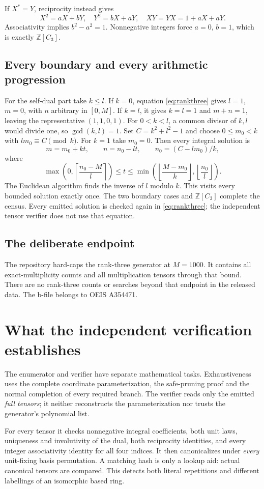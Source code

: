 \documentclass[11pt,a4paper]{article}
\theoremstyle{definition}\newtheorem{definition}[theorem]{Definition}\newtheorem{remark}[theorem]{Remark}
\newcommand{\ZZ}{\mathbb Z}\newcommand{\CC}{\mathbb C}\newcommand{\Q}{\mathbb Q}
\begin{document}
If $X^*=Y$, reciprocity instead gives
\[
X^2=aX+bY,\quad Y^2=bX+aY,\quad XY=YX=1+aX+aY.
\]
Associativity implies $b^2-a^2=1$. Nonnegative integers force $a=0$, $b=1$,
which is exactly $\ZZ[C_3]$.

\subsection{Every boundary and every arithmetic progression}
For the self-dual part take $k\leq l$. If $k=0$, equation
\eqref{eq:rankthree} gives $l=1$, $m=0$, with $n$ arbitrary in $[0,M]$.
If $k=l$, it gives $k=l=1$ and $m+n=1$, leaving the representative $(1,1,0,1)$.
For $0<k<l$, a common divisor of $k,l$ would divide one, so $\gcd(k,l)=1$.
Set $C=k^2+l^2-1$ and choose $0\leq m_0<k$ with $lm_0\equiv C\pmod k$.
For $k=1$ take $m_0=0$. Then every integral solution is
\[
m=m_0+kt,\qquad n=n_0-lt,\qquad n_0=(C-lm_0)/k,
\]
where
\[
\max\left(0,\left\lceil\frac{n_0-M}{l}\right\rceil\right)
\leq t\leq
\min\left(\left\lfloor\frac{M-m_0}{k}\right\rfloor,
          \left\lfloor\frac{n_0}{l}\right\rfloor\right).
\]
The Euclidean algorithm finds the inverse of $l$ modulo $k$. This visits
every bounded solution exactly once. The two boundary cases and $\ZZ[C_3]$
complete the census. Every emitted solution is checked again in
\eqref{eq:rankthree}; the independent tensor verifier does not use that equation.

\subsection{The deliberate endpoint}
The repository hard-caps the rank-three generator at $M=1000$. It contains
all exact-multiplicity counts and all multiplication tensors through that
bound. There are no rank-three counts or searches beyond that endpoint in
the released data. The b-file belongs to OEIS A354471.

\section{What the independent verification establishes}
The enumerator and verifier have separate mathematical tasks. Exhaustiveness
uses the complete coordinate parameterization, the safe-pruning proof and the
normal completion of every required branch. The verifier reads only the emitted
\emph{full tensors}; it neither reconstructs the parameterization nor trusts the
generator's polynomial list.

For every tensor it checks nonnegative integral coefficients, both unit laws,
uniqueness and involutivity of the dual, both reciprocity identities, and every
integer associativity identity for all four indices. It then canonicalizes
under \emph{every} unit-fixing basis permutation. A matching hash is only a
lookup aid: actual canonical tensors are compared. This detects both literal
repetitions and different labellings of an isomorphic based ring.
\end{document}
